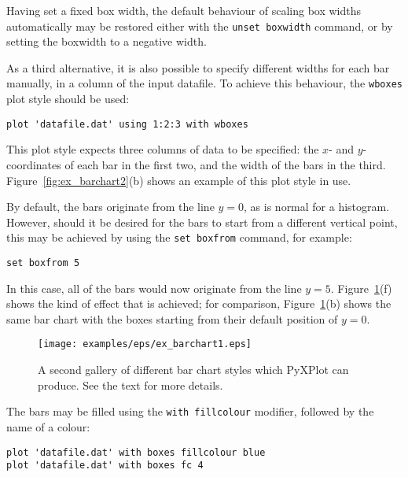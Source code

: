 Having set a fixed box width, the default behaviour of scaling box widths
automatically may be restored either with the {\tt unset boxwidth} command,
or by setting the boxwidth to a negative width.

As a third alternative, it is also possible to specify different widths for
each bar manually, in a column of the input datafile. To achieve this
behaviour, the {\tt wboxes} plot style should be used:

\begin{verbatim} 
plot 'datafile.dat' using 1:2:3 with wboxes
\end{verbatim}

\noindent This plot style expects three columns of data to be specified: the
$x$- and $y$-coordinates of each bar in the first two, and the width of the
bars in the third.  Figure~\ref{fig:ex_barchart2}(b) shows an example of this
plot style in use.

By default, the bars originate from the line $y=0$, as is normal for a
histogram. However, should it be desired for the bars to start from a different
vertical point, this may be achieved by using the {\tt set boxfrom} command,
for example:

\begin{verbatim} 
set boxfrom 5
\end{verbatim}

\noindent In this case, all of the bars would now originate from the line
$y=5$. Figure~\ref{fig:ex_barchart1}(f) shows the kind of effect that is
achieved; for comparison, Figure~\ref{fig:ex_barchart1}(b) shows the same bar
chart with the boxes starting from their default position of $y=0$.

\begin{figure}
\begin{center}
\texttt{[image: examples/eps/ex\_barchart1.eps]}
\end{center}
\caption{A second gallery of different bar chart styles which PyXPlot can produce. See the text for more details.}
\label{fig:ex_barchart1}
\end{figure}

The bars may be filled using the {\tt with fillcolour} modifier, followed by the name of a
colour:

\begin{verbatim} 
plot 'datafile.dat' with boxes fillcolour blue
plot 'datafile.dat' with boxes fc 4
\end{verbatim}

